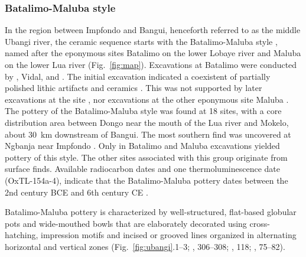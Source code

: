 \documentclass[smallextended,natbib]{svjour3}       %
\begin{document}
\subsubsection*{Batalimo-Maluba style}

In the region between Impfondo and Bangui, henceforth referred to as the middle Ubangi river, the ceramic sequence starts with the Batalimo-Maluba style \citep[75--82]{Seidensticker.2021e}, named after the eponymous sites Batalimo on the lower Lobaye river and Maluba on the lower Lua river (Fig.~\ref{fig:map}). Excavations at Batalimo were conducted by \citet{deBayledesHermens.1975}, Vidal, \citet{Kote.1992} and \citet{Ndanga.2010}. The initial excavation indicated a coexistent of partially polished lithic artifacts and ceramics \citep{Aumassip.1975}. This was not supported by later excavations at the site \citep{Ndanga.2010}, nor excavations at the other eponymous site Maluba \citep{Eggert.1987a}. The pottery of the Batalimo-Maluba style was found at 18 sites, with a core distribution area between Dongo near the mouth of the Lua river and Mokelo, about 30~km downstream of Bangui. The most southern find was uncovered at Ngbanja near Impfondo \citep[Fig.~\ref{fig:timeslices_1_eia}B--E;][81 Fig.~25]{Seidensticker.2021e}. Only in Batalimo and Maluba excavations yielded pottery of this style. The other sites associated with this group originate from surface finds. Available radiocarbon dates and one thermoluminescence date (OxTL-154a-4), indicate that the Batalimo-Maluba pottery dates between the 2nd century BCE and 6th century CE \citep[Fig.~\ref{fig:chrono}; S1; Tab.~S1;][80 Fig.~28]{Seidensticker.2021e}. 

Batalimo-Maluba pottery is characterized by well-structured, flat-based globular pots and wide-mouthed bowls that are elaborately decorated using cross-hatching, impression motifs and incised or grooved lines organized in alternating horizontal and vertical zones (Fig.~\ref{fig:ubangi}.1--3; \citeauthor{Eggert.1993} \citeyear{Eggert.1993}, 306--308; \citeauthor{Seidensticker.2016b} \citeyear{Seidensticker.2016b}, 118; \citeyear{Seidensticker.2021e}, 75--82).
\end{document}
